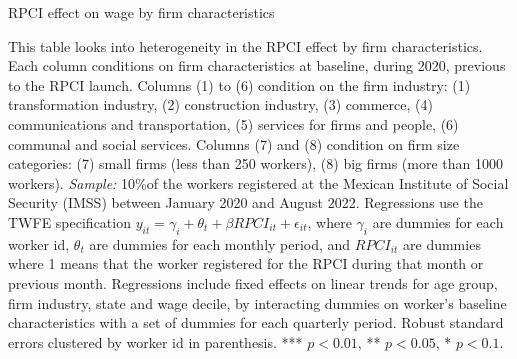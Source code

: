 \documentclass[oneside,11pt]{article}
\begin{document}
\begin{landscape}

\begin{table}[H]
    \caption{RPCI effect on wage by firm characteristics}
    \label{twfe_wage_hetero_firm_char}
    \begin{center}
    \scriptsize{}
    \end{center}
\end{table}
\scriptsize{
\noindent This table looks into heterogeneity in the RPCI effect by firm characteristics. Each column conditions on firm characteristics at baseline, during 2020, previous to the RPCI launch. Columns (1) to (6) condition on the firm industry: (1) transformation industry, (2) construction industry, (3) commerce, (4) communications and transportation, (5) services for firms and people, (6) communal and social services. Columns (7) and (8) condition on firm size categories: (7) small firms (less than 250 workers), (8) big firms (more than 1000 workers). \textit{Sample:} 10\%of the workers registered at the Mexican Institute of Social Security (IMSS) between January 2020 and August 2022. Regressions use the TWFE specification $y_{it} = \gamma_{i} + \theta_{t}+ \beta RPCI_{it} +\epsilon_{it}$, where $\gamma_{i}$ are dummies for each worker id, $\theta_{t}$ are dummies for each monthly period, and $RPCI_{it}$ are dummies where 1 means that the worker registered for the RPCI during that month or previous month. Regressions include fixed effects on linear trends for age group, firm industry, state and wage decile, by interacting dummies on worker's baseline characteristics with a set of dummies for each quarterly period. Robust standard errors clustered by worker id in parenthesis. *** $p<0.01$, ** $p<0.05$, * $p<0.1$.
}

\end{landscape}

\clearpage
\end{document}
